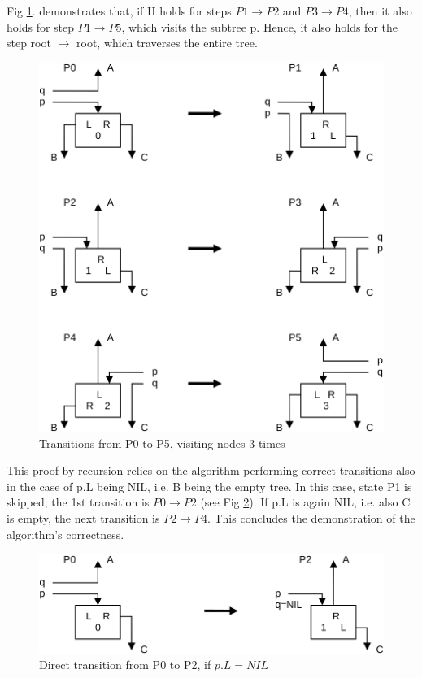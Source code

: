 Fig \ref{fig:transition-3-times}. demonstrates that, if H holds for steps $P1 \rightarrow P2$
and $P3 \rightarrow P4$, then it also holds for step $P1 \rightarrow P5$, which visits the
subtree p. Hence, it also holds for the step root $\rightarrow$ root, which traverses the entire tree.
\begin{figure}[h!]
  \centering
  \includegraphics[width=.9\textwidth]{i/v}
  \caption{Transitions from P0 to P5, visiting nodes 3 times}
  \label{fig:transition-3-times}
\end{figure}

This proof by recursion relies on the algorithm performing correct transitions also in the
case of p.L being NIL, i.e. B being the empty tree. In this case, state P1 is skipped; the
1st transition is $P0 \rightarrow P2$ (see Fig \ref{fig:transition-direct}).
If p.L is again NIL, i.e. also C is empty, the next transition is $P2 \rightarrow P4$.
This concludes the demonstration of the algorithm's correctness.
\begin{figure}[h!]
  \centering
  \includegraphics[width=\textwidth]{i/w}
  \caption{Direct transition from P0 to P2, if $p.L = NIL$}
  \label{fig:transition-direct}
\end{figure}

